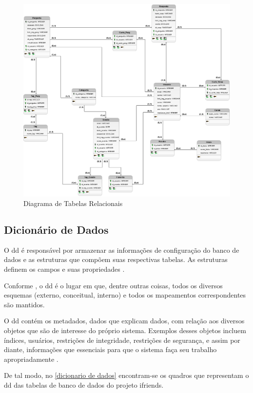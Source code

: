 \begin{figure}[htb]
\centering
\caption{Diagrama de Tabelas Relacionais}
\label{diagrama_TabelasRelacionais}
\includegraphics[width=1\textwidth]{anexos/Imagens_Diagramas/DTR_IFriends.png}
\end{figure}
\FloatBarrier

\subsection{Dicionário de Dados}
O \ac{dd} é responsável por armazenar as informações de configuração do banco de dados e as estruturas que compõem suas respectivas tabelas. As estruturas definem os campos e suas propriedades \cite{alvesbanco}.

Conforme , o \ac{dd} é o lugar em que, dentre outras coisas, todos os diversos esquemas (externo, conceitual, interno) e todos os mapeamentos correspondentes são mantidos.

O \ac{dd} contém os metadados, dados que explicam dados, com relação aos diversos objetos que são de interesse do próprio sistema. Exemplos desses objetos incluem índices, usuários, restrições de integridade, restrições de segurança, e assim por diante, informações que essenciais para que o sistema faça seu trabalho apropriadamente \cite{date2004introdução}.

De tal modo, no \autoref{dicionario de dados} encontram-se os quadros que representam o \ac{dd} das tabelas de banco de dados do projeto \gls{ifriends}.
